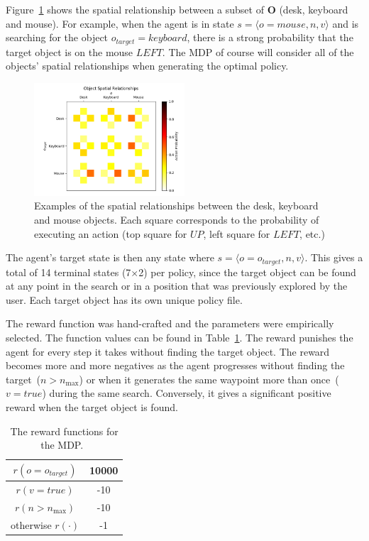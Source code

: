 \documentclass[a4paper, twoside]{article}
\begin{document}
Figure~\ref{fig:obj-relationships} shows the spatial relationship between a subset of $\mathbf{O}$ (desk, keyboard and mouse). For example, when the agent is in state ${s=\langle o=mouse, n, v \rangle}$ and is searching for the object $o_{target} = keyboard$, there is a strong probability that the target object is on the mouse $LEFT$. The MDP of course will consider all of the objects' spatial relationships when generating the optimal policy.

\begin{figure}
  \centering
  \includegraphics[width=0.5\textwidth]{figures/object_relationships.png}
  \caption{Examples of the spatial relationships between the desk, keyboard and mouse objects. Each square corresponds to the probability of executing an action (top square for $UP$, left square for $LEFT$, etc.)}\label{fig:obj-relationships}
\end{figure}

The agent's target state is then any state where ${s = \langle o=o_{target}, n, v \rangle}$. This gives a total of 14 terminal states (7$\times$2) per policy, since the target object can be found at any point in the search or in a position that was previously explored by the user. Each target object has its own unique policy file.

The reward function was hand-crafted and the parameters were empirically selected. The function values can be found in Table~\ref{tab:rewards}. The reward punishes the agent for every step it takes without finding the target object. The reward becomes more and more negatives as the agent progresses without finding the target~($n > n_{\max}$) or when it generates the same waypoint more than once~($v = true$) during the same search. Conversely, it gives a significant positive reward when the target object is found. 

\begin{table}
  \centering
  \caption{The reward functions for the MDP.\ }\label{tab:rewards}
  \begin{tabular}{cc}
    \toprule
    $r(o = o_{target})$ & 10000 \\ \midrule
    $r(v = true)$  & -10 \\ \midrule
    $r(n > n_{\max})$ & -10 \\ \midrule
    otherwise $r(\cdot)$ & -1  \\ \midrule
    \bottomrule
  \end{tabular}
\end{table}
\end{document}
